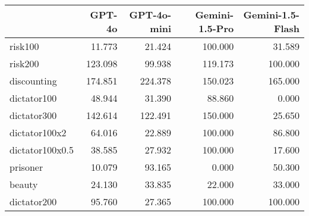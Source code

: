 \begin{tabular}{lrrrr}
\toprule 
 & GPT-4o & GPT-4o-mini & Gemini-1.5-Pro & Gemini-1.5-Flash \\
\midrule
risk100 & 11.773 & 21.424 & 100.000 & 31.589 \\
risk200 & 123.098 & 99.938 & 119.173 & 100.000 \\
discounting & 174.851 & 224.378 & 150.023 & 165.000 \\
dictator100 & 48.944 & 31.390 & 88.860 & 0.000 \\
dictator300 & 142.614 & 122.491 & 150.000 & 25.650 \\
dictator100x2 & 64.016 & 22.889 & 100.000 & 86.800 \\
dictator100x0.5 & 38.585 & 27.932 & 100.000 & 17.600 \\
prisoner & 10.079 & 93.165 & 0.000 & 50.300 \\
beauty & 24.130 & 33.835 & 22.000 & 33.000 \\
dictator200 & 95.760 & 27.365 & 100.000 & 100.000 \\
\bottomrule
\end{tabular}

